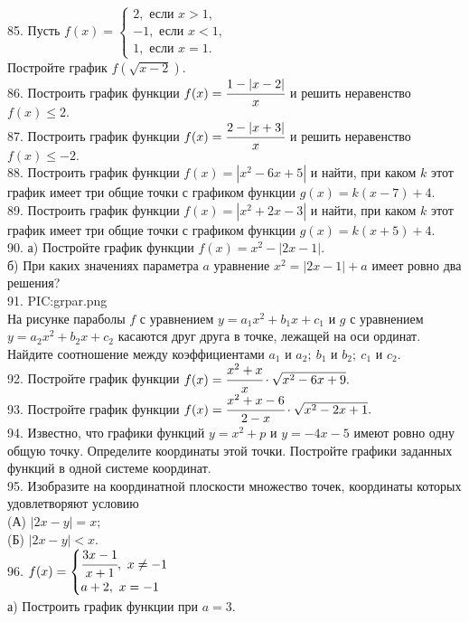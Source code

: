 85. Пусть $f(x)=\begin{cases} 2, \text{ если } x>1,\\ -1, \text{ если } x<1,\\ 1, \text{ если } x=1.\end{cases}$\\
Постройте график $f(\sqrt{x-2}).$\\
86. Построить график функции $f(x)=\cfrac{1-|x-2|}{x}$ и решить неравенство $f(x)\leqslant 2.$\\
87. Построить график функции $f(x)=\cfrac{2-|x+3|}{x}$ и решить неравенство $f(x)\leqslant -2.$\\
88. Построить график функции $f(x)=|x^2-6x+5|$ и найти, при каком $k$ этот график имеет три общие точки с графиком функции $g(x)=k(x-7)+4.$\\
89. Построить график функции $f(x)=|x^2+2x-3|$ и найти, при каком $k$ этот график имеет три общие точки с графиком функции $g(x)=k(x+5)+4.$\\
90. а) Постройте график функции $f(x)=x^2-|2x-1|.$\\
б) При каких значениях параметра $a$ уравнение $x^2=|2x-1|+a$ имеет ровно два решения?\\
91. {{PIC:grpar.png}}\\
На рисунке параболы $f$ с уравнением $y=a_1 x^2+b_1x+c_1$ и $g$ с уравнением $y=a_2 x^2+b_2x+c_2$ касаются друг друга в точке, лежащей на оси ординат. Найдите соотношение между коэффициентами $a_1$ и $a_2;\ b_1$ и $b_2;\ c_1$ и $c_2.$\\
92. Постройте график функции $f(x)=\cfrac{x^2+x}{x}\cdot\sqrt{x^2-6x+9}.$\\
93. Постройте график функции $f(x)=\cfrac{x^2+x-6}{2-x}\cdot\sqrt{x^2-2x+1}.$\\
94. Известно, что графики функций $y=x^2+p$ и $y=-4x-5$ имеют ровно одну общую точку. Определите координаты этой точки. Постройте графики заданных функций в одной системе координат.\\
95. Изобразите на координатной плоскости множество точек, координаты которых удовлетворяют условию\\
(А) $|2x-y|=x;$\\
(Б) $|2x-y|<x.$\\
96. $f(x)=\begin{cases} \cfrac{3x-1}{x+1},\ x\neq-1\\a+2,\ x=-1 \end{cases}$\\
а) Построить график функции при $a=3.$\\
